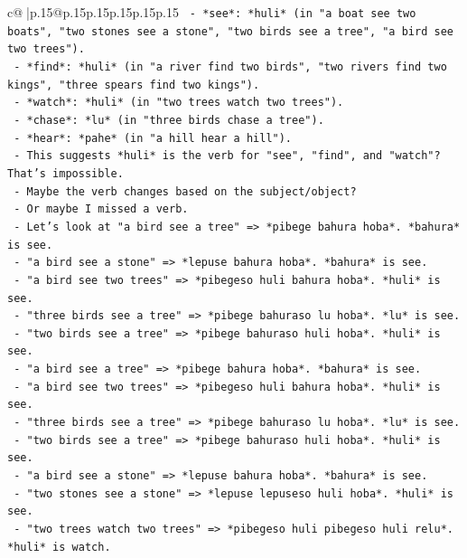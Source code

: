 \documentclass{article}
\begin{document}
{\begin{supertabular}{c@{$\;$}|p{.15\linewidth}@{}p{.15\linewidth}p{.15\linewidth}p{.15\linewidth}p{.15\linewidth}p{.15\linewidth}}
{{{\texttt{            {-} *see*: *huli* (in "a boat see two boats", "two stones see a stone", "two birds see a tree", "a bird see two trees").} \\
\texttt{            {-} *find*: *huli* (in "a river find two birds", "two rivers find two kings", "three spears find two kings").} \\
\texttt{            {-} *watch*: *huli* (in "two trees watch two trees").} \\
\texttt{            {-} *chase*: *lu* (in "three birds chase a tree").} \\
\texttt{            {-} *hear*: *pahe* (in "a hill hear a hill").} \\
\texttt{            {-} This suggests *huli* is the verb for "see", "find", and "watch"? That's impossible.} \\
\texttt{            {-} Maybe the verb changes based on the subject/object?} \\
\texttt{            {-} Or maybe I missed a verb.} \\
\texttt{            {-} Let's look at "a bird see a tree" => *pibege bahura hoba*. *bahura* is see.} \\
\texttt{            {-} "a bird see a stone" => *lepuse bahura hoba*. *bahura* is see.} \\
\texttt{            {-} "a bird see two trees" => *pibegeso huli bahura hoba*. *huli* is see.} \\
\texttt{            {-} "three birds see a tree" => *pibege bahuraso lu hoba*. *lu* is see.} \\
\texttt{            {-} "two birds see a tree" => *pibege bahuraso huli hoba*. *huli* is see.} \\
\texttt{            {-} "a bird see a tree" => *pibege bahura hoba*. *bahura* is see.} \\
\texttt{            {-} "a bird see two trees" => *pibegeso huli bahura hoba*. *huli* is see.} \\
\texttt{            {-} "three birds see a tree" => *pibege bahuraso lu hoba*. *lu* is see.} \\
\texttt{            {-} "two birds see a tree" => *pibege bahuraso huli hoba*. *huli* is see.} \\
\texttt{            {-} "a bird see a stone" => *lepuse bahura hoba*. *bahura* is see.} \\
\texttt{            {-} "two stones see a stone" => *lepuse lepuseso huli hoba*. *huli* is see.} \\
\texttt{            {-} "two trees watch two trees" => *pibegeso huli pibegeso huli relu*. *huli* is watch.} \\
}}}
\end{supertabular}}
\end{document}
